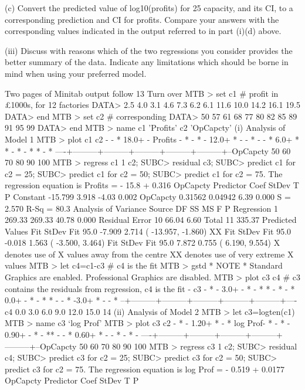 \documentclass[a4paper,12pt]{article}
\begin{document}
(c) Convert the predicted value of log10(profits) for 25%
capacity, and its CI, to a corresponding prediction and CI for
profits. Compare your answers with the corresponding values
indicated in the output referred to in part (i)(d) above.

(iii) Discuss with reasons which of the two regressions you consider provides
the better summary of the data. Indicate any limitations which should be
borne in mind when using your preferred model.

Two pages of Minitab output follow
13 Turn over
MTB > set c1 # profit in £1000s, for 12 factories
DATA> 2.5 4.0 3.1 4.6 7.3 6.2 6.1 11.6 10.0 14.2 16.1 19.5 DATA> end
MTB > set c2 # corresponding %
DATA> 50 57 61 68 77 80 82 85 89 91 95 99 DATA> end
MTB > name c1 'Profits' c2 'OpCapcty'
(i) Analysis of Model 1
MTB > plot c1 c2
-
- *
18.0+
-
Profits - *
- *
-
12.0+ *
-
- *
-
- *
6.0+ * *
- *
- * *
- *
----+---------+---------+---------+---------+---------+--OpCapcty
50 60 70 80 90 100
MTB > regress c1 1 c2;
SUBC> residual c3;
SUBC> predict c1 for c2 = 25; SUBC> predict c1 for c2 = 50; SUBC> predict c1 for c2 = 75.
The regression equation is Profits = - 15.8 + 0.316 OpCapcty
Predictor Coef StDev T P
Constant -15.799 3.918 -4.03 0.002
OpCapcty 0.31562 0.04942 6.39 0.000
S = 2.570 R-Sq = 80.3%
Analysis of Variance
Source DF SS MS F P
Regression 1 269.33 269.33 40.78 0.000
Residual Error 10 66.04 6.60
Total 11 335.37
Predicted Values
Fit StDev Fit 95.0%
-7.909 2.714 ( -13.957, -1.860) XX
Fit StDev Fit 95.0%
-0.018 1.563 ( -3.500, 3.464)
Fit StDev Fit 95.0%
7.872 0.755 ( 6.190, 9.554)
X denotes use of X values away from the centre
XX denotes use of very extreme X values
MTB > let c4=c1-c3 # c4 is the fit
MTB > gstd
* NOTE * Standard Graphics are enabled. Professional Graphics are disabled.
MTB > plot c3 c4 # c3 contains the residuals from regression, c4 is the fit
-
c3 - *
-
3.0+
- *
- * *
- *
- *
0.0+
- *
- * *
-
- *
-3.0+ *
-
- *
--+---------+---------+---------+---------+---------+----c4
0.0 3.0 6.0 9.0 12.0 15.0
14
(ii) Analysis of Model 2
MTB > let c3=logten(c1)
MTB > name c3 ‘log Prof’
MTB > plot c3 c2
- *
-
1.20+ *
- *
log Prof- *
- *
-
0.90+
- *
- **
-
- *
0.60+ *
-
- *
- *
-
----+---------+---------+---------+---------+---------+--OpCapcty
50 60 70 80 90 100
MTB > regress c3 1 c2;
SUBC> residual c4;
SUBC> predict c3 for c2 = 25; SUBC> predict c3 for c2 = 50; SUBC> predict c3 for c2 = 75.
The regression equation is log Prof = - 0.519 + 0.0177 OpCapcty
Predictor Coef StDev T P
\end{document}
